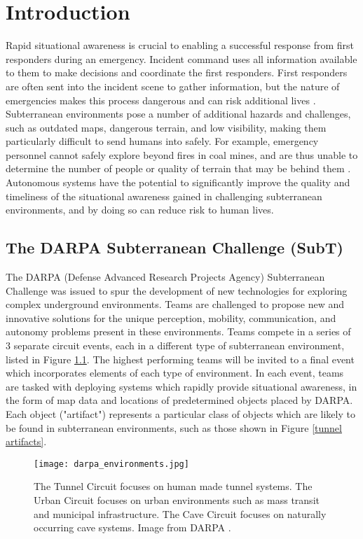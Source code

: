 \chapter{Introduction}

Rapid situational awareness is crucial to enabling a successful response from first responders during an emergency. Incident command uses all information available to them to make decisions and coordinate the first responders. First responders are often sent into the incident scene to gather information, but the nature of emergencies makes this process dangerous and can risk additional lives \cite{whysubtmatters}. Subterranean environments pose a number of additional hazards and challenges, such as outdated maps, dangerous terrain, and low visibility, making them particularly difficult to send humans into safely. For example, emergency personnel cannot safely explore beyond fires in coal mines, and are thus unable to determine the number of people or quality of terrain that may be behind them \cite{mshapresentation}. Autonomous systems have the potential to significantly improve the quality and timeliness of the situational awareness gained in challenging subterranean environments, and by doing so can reduce risk to human lives.

\section{The DARPA Subterranean Challenge (SubT)}

The DARPA (Defense Advanced Research Projects Agency) Subterranean Challenge was issued to spur the development of new technologies for exploring complex underground environments. Teams are challenged to propose new and innovative solutions for the unique perception, mobility, communication, and autonomy problems present in these environments. Teams compete in a series of 3 separate circuit events, each in a different type of subterranean environment, listed in Figure \ref{darpa_environments}. The highest performing teams will be invited to a final event which incorporates elements of each type of environment. In each event, teams are tasked with deploying systems which rapidly provide situational awareness, in the form of map data and locations of predetermined objects placed by DARPA. Each object ("artifact") represents a particular class of objects which are likely to be found in subterranean environments, such as those shown in Figure \ref{tunnel artifacts}.

\begin{figure}	
	\centering
	\texttt{[image: darpa\_environments.jpg]}
	\caption[DARPA Subterranean Challenge environments]{The Tunnel Circuit focuses on human made tunnel systems. The Urban Circuit focuses on urban environments such as mass transit and municipal infrastructure. The Cave Circuit focuses on naturally occurring cave systems. Image from DARPA \cite{subtenvironments}.}
	\label{darpa_environments}
\end{figure}

